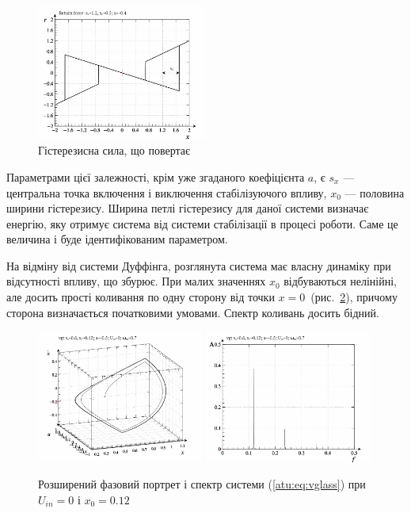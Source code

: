 \begin{figure}[htb!]
\centerline{\includegraphics[width=0.5\textwidth]{p/cha/vg/vg_rf-p_rf.png} }
\caption{Гістерезисна сила, що повертає}
\label{atu:f:vg_rf}
\end{figure}

Параметрами цієї залежності, крім уже згаданого коефіцієнта
$a$, є
$s_x$ --- центральна точка включення і виключення стабілізуючого
впливу,
$x_0$ --- половина ширини гістерезису. Ширина петлі гістерезису
для даної системи визначає енергію, яку отримує система від
системи стабілізації в процесі роботи. Саме це величина і буде
ідентифікованим параметром.


На відміну від системи Дуффінга, розглянута система має власну
динаміку при відсутності впливу, що збурює. При малих значеннях
$x_0$ відбуваються нелінійні, але досить прості коливання по
одну сторону від точки
$ x = 0 $~(рис.~\ref{atu:f:vglass_phase_f_u00}), причому сторона визначається
початковими умовами. Спектр коливань досить бідний.

\begin{figure}[ht!]
\begin{center}
  \includegraphics[width=0.49\textwidth]{p/cha/vg/vg_0-p_phe_0x00_0x70_0x12.png}
  \hfill
  \includegraphics[width=0.49\textwidth]{p/cha/vg/vg_fft-p_f_0x00_0x70_0x12.png}
\end{center}
\caption{Розширений фазовий портрет і спектр системи (\ref{atu:eq:vglass}) при $ U_{in} = 0 $ і $ x_0 = 0.12 $}
\label{atu:f:vglass_phase_f_u00}
\end{figure}

